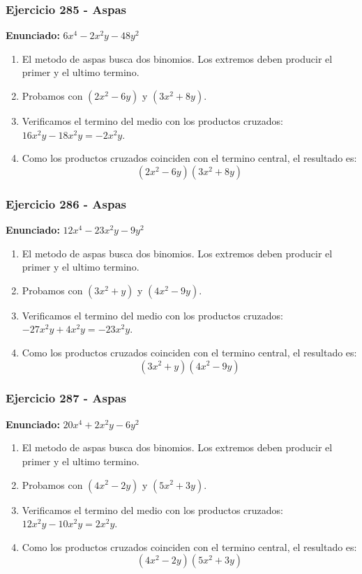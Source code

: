 \documentclass[11pt,a4paper]{article}
\begin{document}
\vspace{0.2cm}
\subsubsection*{Ejercicio 285 - Aspas}
\textbf{Enunciado:} $ 6 x^{4} - 2 x^{2} y - 48 y^{2} $\par
\begin{enumerate}[leftmargin=2em]
\item El metodo de aspas busca dos binomios. Los extremos deben producir el primer y el ultimo termino.
\item Probamos con \((2 x^{2} - 6 y)\) y \((3 x^{2} + 8 y)\).
\item Verificamos el termino del medio con los productos cruzados: \(16 x^{2} y- 18 x^{2} y=- 2 x^{2} y\).
\item Como los productos cruzados coinciden con el termino central, el resultado es: \[\boxed{\left(2 x^{2} - 6 y\right)\left(3 x^{2} + 8 y\right)}\]
\end{enumerate}

\vspace{0.2cm}
\subsubsection*{Ejercicio 286 - Aspas}
\textbf{Enunciado:} $ 12 x^{4} - 23 x^{2} y - 9 y^{2} $\par
\begin{enumerate}[leftmargin=2em]
\item El metodo de aspas busca dos binomios. Los extremos deben producir el primer y el ultimo termino.
\item Probamos con \((3 x^{2} + y)\) y \((4 x^{2} - 9 y)\).
\item Verificamos el termino del medio con los productos cruzados: \(- 27 x^{2} y+4 x^{2} y=- 23 x^{2} y\).
\item Como los productos cruzados coinciden con el termino central, el resultado es: \[\boxed{\left(3 x^{2} + y\right)\left(4 x^{2} - 9 y\right)}\]
\end{enumerate}

\vspace{0.2cm}
\subsubsection*{Ejercicio 287 - Aspas}
\textbf{Enunciado:} $ 20 x^{4} + 2 x^{2} y - 6 y^{2} $\par
\begin{enumerate}[leftmargin=2em]
\item El metodo de aspas busca dos binomios. Los extremos deben producir el primer y el ultimo termino.
\item Probamos con \((4 x^{2} - 2 y)\) y \((5 x^{2} + 3 y)\).
\item Verificamos el termino del medio con los productos cruzados: \(12 x^{2} y- 10 x^{2} y=2 x^{2} y\).
\item Como los productos cruzados coinciden con el termino central, el resultado es: \[\boxed{\left(4 x^{2} - 2 y\right)\left(5 x^{2} + 3 y\right)}\]
\end{enumerate}
\end{document}
